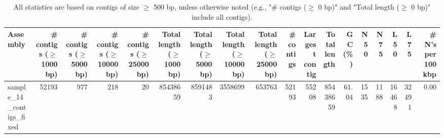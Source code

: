 \documentclass[12pt,a4paper]{article}
\begin{document}
\begin{table}[ht]
\begin{center}
\caption{All statistics are based on contigs of size $\geq$ 500 bp, unless otherwise noted (e.g., "\# contigs ($\geq$ 0 bp)" and "Total length ($\geq$ 0 bp)" include all contigs).}
\begin{tabular}{|l*{17}{|r}|}
\hline
Assembly & \# contigs ($\geq$ 1000 bp) & \# contigs ($\geq$ 5000 bp) & \# contigs ($\geq$ 10000 bp) & \# contigs ($\geq$ 25000 bp) & Total length ($\geq$ 1000 bp) & Total length ($\geq$ 5000 bp) & Total length ($\geq$ 10000 bp) & Total length ($\geq$ 25000 bp) & \# contigs & Largest contig & Total length & GC (\%) & N50 & N75 & L50 & L75 & \# N's per 100 kbp \\ \hline
sample\_14\_contigs\_fixed & 52193 & 977 & 218 & 20 & 85438659 & 8591483 & 3558699 & 653763 & 52193 & 55208 & 85438659 & 61.04 & 1535 & 1188 & 16468 & 32491 & 0.00 \\ \hline
\end{tabular}
\end{center}
\end{table}
\end{document}
